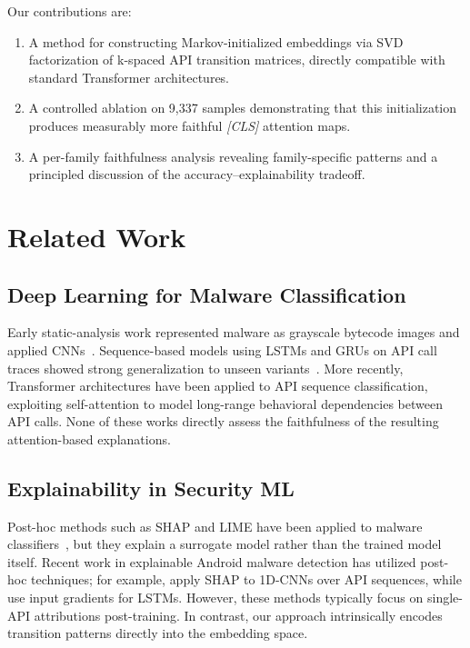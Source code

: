\documentclass[12pt]{article}
\begin{document}
Our contributions are:
\begin{enumerate}
  \item A method for constructing Markov-initialized embeddings via SVD
    factorization of k-spaced API transition matrices, directly compatible
    with standard Transformer architectures.
  \item A controlled ablation on 9,337 samples demonstrating that this
    initialization produces measurably more faithful \textit{[CLS]}
    attention maps.
  \item A per-family faithfulness analysis revealing family-specific
    patterns and a principled discussion of the accuracy--explainability
    tradeoff.
\end{enumerate}

\section{Related Work}

\subsection{Deep Learning for Malware Classification}
Early static-analysis work represented malware as grayscale bytecode
images and applied CNNs~\citep{nataraj2011malware}. Sequence-based models
using LSTMs and GRUs on API call traces showed strong generalization to
unseen variants~\citep{ye2019deep}. More recently, Transformer
architectures have been applied to API sequence classification, exploiting
self-attention to model long-range behavioral dependencies between API
calls. None of these works directly assess the faithfulness of the
resulting attention-based explanations.

\subsection{Explainability in Security ML}
Post-hoc methods such as SHAP and LIME have been applied to malware
classifiers~\citep{lundberg2017shap}, but they explain a surrogate model
rather than the trained model itself. Recent work in explainable Android malware detection has utilized post-hoc techniques; for example, \citet{soi2024enhancing} apply SHAP to 1D-CNNs over API sequences, while \citet{wu2021why} use input gradients for LSTMs. However, these methods typically focus on single-API attributions post-training. In contrast, our approach intrinsically encodes transition patterns directly into the embedding space.
\end{document}
